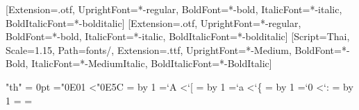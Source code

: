 \usepackage{fontspec}
\usepackage{polyglossia}
\setdefaultlanguage{thai}

\setmainfont{texgyrepagella}[Extension=.otf,
  UprightFont=*-regular, BoldFont=*-bold,
  ItalicFont=*-italic, BoldItalicFont=*-bolditalic]
\newfontfamily{}[Extension=.otf,
  UprightFont=*-regular, BoldFont=*-bold,
  ItalicFont=*-italic, BoldItalicFont=*-bolditalic]
\newfontfamily{}[Script=Thai, Scale=1.15,
  Path=fonts/, Extension=.ttf,
  UprightFont=*-Medium, BoldFont=*-Bold,
  ItalicFont=*-MediumItalic, BoldItalicFont=*-BoldItalic]

\XeTeXlinebreaklocale "th"
\XeTeXlinebreakskip = 0pt
\newXeTeXintercharclass\thaicharclass
\newXeTeXintercharclass\latincharclass
{}="0E01 \loop\ifnum{}<"0E5C
  \XeTeXcharclass{}=\thaicharclass \advance{} by 1 \repeat
{}=`A \loop\ifnum{}<`[
  \XeTeXcharclass{}=\latincharclass \advance{} by 1 \repeat
{}=`a \loop\ifnum{}<`\{
  \XeTeXcharclass{}=\latincharclass \advance{} by 1 \repeat
{}=`0 \loop\ifnum{}<`:
  \XeTeXcharclass{}=\latincharclass \advance{} by 1 \repeat
\XeTeXinterchartoks\thaicharclass\latincharclass={ }
\XeTeXinterchartoks\latincharclass\thaicharclass={ }

\usepackage[a4paper,top=2.5cm,bottom=2.5cm,left=2.8cm,right=2.8cm]{geometry}
\newcommand{\thaistretch}{1.6}
\linespread{\thaistretch}

\usepackage{indentfirst}
\makeatletter
\let\nofrench@indent\french@indent
\makeatother
\setlength{\parindent}{1.5cm}
\setlength{\parskip}{0.8em}


